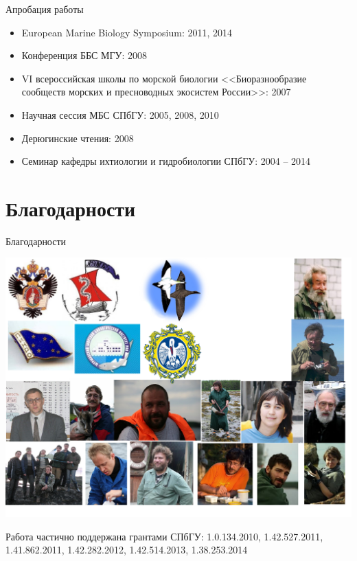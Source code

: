 \documentclass{beamer}
\begin{document}
\begin{frame}{Апробация работы}
\begin{itemize}
	\item{European Marine Biology Symposium: 2011, 2014}
	\item{Конференция ББС МГУ: 2008}
	\item{VI всероссийская школы по морской биологии <<Биоразнообразие сообществ морских и пресноводных экосистем России>>: 2007}
	\item{Научная сессия МБС СПбГУ: 2005, 2008, 2010}
	\item{Дерюгинские чтения: 2008}
	\item{Семинар кафедры ихтиологии и гидробиологии СПбГУ: 2004 -- 2014}
\end{itemize}
\end{frame}

		\section*{Благодарности}
\begin{frame}{Благодарности}
\begin{center}
			\includegraphics[height=.7\textheight]{blagodarnosti.pdf}\\
\end{center}
{\tiny Работа частично поддержана грантами СПбГУ: 1.0.134.2010, 1.42.527.2011, 1.41.862.2011, 1.42.282.2012, 1.42.514.2013, 1.38.253.2014}
\end{frame}
\end{document}

